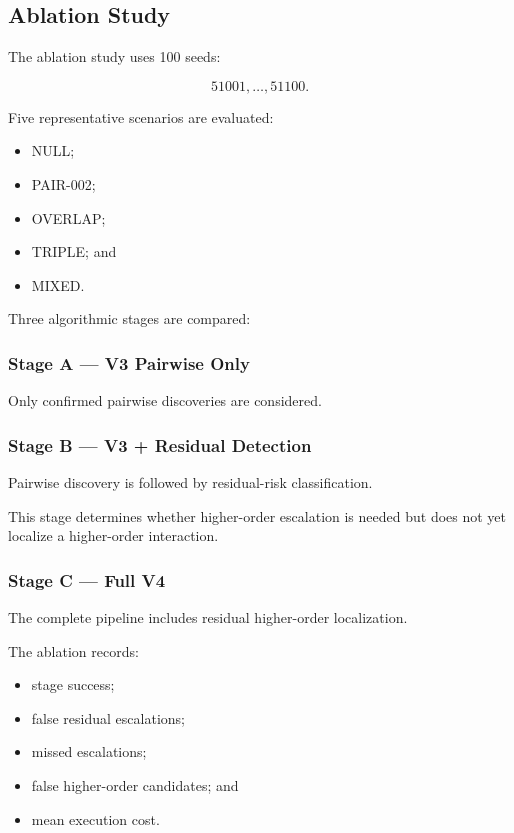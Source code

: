 \subsection{Ablation Study}

The ablation study uses 100 seeds:

\[
51001,\ldots,51100.
\]

Five representative scenarios are evaluated:

\begin{itemize}
\tightlist
\item
  NULL;
\item
  PAIR-002;
\item
  OVERLAP;
\item
  TRIPLE; and
\item
  MIXED.
\end{itemize}

Three algorithmic stages are compared:

\subsubsection{Stage A --- V3 Pairwise Only}

Only confirmed pairwise discoveries are considered.

\subsubsection{Stage B --- V3 + Residual Detection}

Pairwise discovery is followed by residual-risk classification.

This stage determines whether higher-order escalation is needed but does not yet localize a higher-order interaction.

\subsubsection{Stage C --- Full V4}

The complete pipeline includes residual higher-order localization.

The ablation records:

\begin{itemize}
\tightlist
\item
  stage success;
\item
  false residual escalations;
\item
  missed escalations;
\item
  false higher-order candidates; and
\item
  mean execution cost.
\end{itemize}

